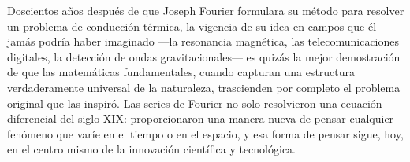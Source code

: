 Doscientos años después de que Joseph Fourier formulara su método para resolver un problema de conducción térmica, la vigencia de su idea en campos que él jamás podría haber imaginado —la resonancia magnética, las telecomunicaciones digitales, la detección de ondas gravitacionales— es quizás la mejor demostración de que las matemáticas fundamentales, cuando capturan una estructura verdaderamente universal de la naturaleza, trascienden por completo el problema original que las inspiró. Las series de Fourier no solo resolvieron una ecuación diferencial del siglo XIX: proporcionaron una manera nueva de pensar cualquier fenómeno que varíe en el tiempo o en el espacio, y esa forma de pensar sigue, hoy, en el centro mismo de la innovación científica y tecnológica.
